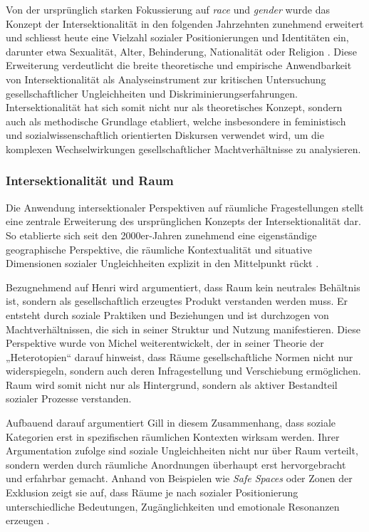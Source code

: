 Von der ursprünglich starken Fokussierung auf \textit{race} und \textit{gender} wurde das Konzept der Intersektionalität in den folgenden Jahrzehnten zunehmend erweitert und schliesst heute eine Vielzahl sozialer Positionierungen und Identitäten ein, darunter etwa Sexualität, Alter, Behinderung, Nationalität oder Religion \parencite{bauerIntersectionalityQuantitativeResearch2021, bowlegInvitedReflectionQuantifying2016}. Diese Erweiterung verdeutlicht die breite theoretische und empirische Anwendbarkeit von Intersektionalität als Analyseinstrument zur kritischen Untersuchung gesellschaftlicher Ungleichheiten und Diskriminierungserfahrungen. Intersektionalität hat sich somit nicht nur als theoretisches Konzept, sondern auch als methodische Grundlage etabliert, welche insbesondere in feministisch und sozialwissenschaftlich orientierten Diskursen verwendet wird, um die komplexen Wechselwirkungen gesellschaftlicher Machtverhältnisse zu analysieren.


\subsubsection{Intersektionalität und Raum}

Die Anwendung intersektionaler Perspektiven auf räumliche Fragestellungen stellt eine zentrale Erweiterung des ursprünglichen Konzepts der Intersektionalität dar. So etablierte sich seit den 2000er-Jahren zunehmend eine eigenständige geographische Perspektive, die räumliche Kontextualität und situative Dimensionen sozialer Ungleichheiten explizit in den Mittelpunkt rückt \parencite{valentineTheorizingResearchingIntersectionality2007, rodo-de-zarateIntersectionalityFeministGeographies2018}.

Bezugnehmend auf Henri \textcite{lefebvreProductionLespace1974} wird argumentiert, dass Raum kein neutrales Behältnis ist, sondern als gesellschaftlich erzeugtes Produkt verstanden werden muss. Er entsteht durch soziale Praktiken und Beziehungen und ist durchzogen von Machtverhältnissen, die sich in seiner Struktur und Nutzung manifestieren. Diese Perspektive wurde von Michel \textcite{foucaultEspacesAutres2004} weiterentwickelt, der in seiner Theorie der „Heterotopien“ darauf hinweist, dass Räume gesellschaftliche Normen nicht nur widerspiegeln, sondern auch deren Infragestellung und Verschiebung ermöglichen. Raum wird somit nicht nur als Hintergrund, sondern als aktiver Bestandteil sozialer Prozesse verstanden.

Aufbauend darauf argumentiert Gill \textcite{valentineTheorizingResearchingIntersectionality2007} in diesem Zusammenhang, dass soziale Kategorien erst in spezifischen räumlichen Kontexten wirksam werden. Ihrer Argumentation zufolge sind soziale Ungleichheiten nicht nur über Raum verteilt, sondern werden durch räumliche Anordnungen überhaupt erst hervorgebracht und erfahrbar gemacht. Anhand von Beispielen wie \textit{Safe Spaces} oder Zonen der Exklusion zeigt sie auf, dass Räume je nach sozialer Positionierung unterschiedliche Bedeutungen, Zugänglichkeiten und emotionale Resonanzen erzeugen \parencite[vgl.][S. 548 - 549]{rodo-de-zarateIntersectionalityFeministGeographies2018}.

